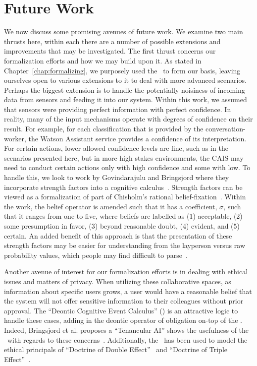 \section{Future Work}

We now discuss some promising avenues of future work. We examine two main
thrusts here, within each there are a number of possible extensions and
improvements that may be investigated. The first thrust concerns our
formalization efforts and how we may build upon it. As stated in
Chapter~\ref{chap:formalizing}, we purposely used the \CEC\ to form our
basis, leaving ourselves open to various extensions to it to deal with
more advanced scenarios. Perhaps the biggest extension is to handle the
potentially noisiness of incoming data from sensors and feeding it into
our system. Within this work, we assumed that sensors were providing
perfect information with perfect confidence. In reality, many of the input
mechanisms operate with degrees of confidence on their result. For example,
for each classification that is provided by the conversation-worker, the
Watson Assistant service provides a confidence of its interpretation. For
certain actions, lower allowed confidence levels are fine, such as in the
scenarios presented here, but in more high stakes environments,
the CAIS may need to conduct certain actions only with high confidence and
some with low. To handle this, we look to work by Govindarajulu and
Bringsjord where they incorporate strength factors into a cognitive
calculus~\cite{govindarajulu_strength_2017}. Strength factors can be viewed
as a formalization of part of Chisholm’s rational
belief-fixation~\cite{theory.of.knowledge3.chisholm}. Within the work,
the belief operator is amended such that it has a coefficient, $\sigma$,
such that it ranges from one to five, where beliefs are labelled as (1)
acceptable, (2) some presumption in favor, (3) beyond reasonable doubt,
(4) evident, and (5) certain. An added benefit of this approach is that
the presentation of these strength factors may be easier for understanding
from the layperson versus raw probability values, which people may find
difficult to parse~\cite{kaye_can_1991}.

Another avenue of interest for our formalization efforts is in dealing with 
ethical issues and matters of privacy. When utilizing these collaborative spaces,
as information about specific users grows, a user would have a reasonable
belief that the system will not offer sensitive information to their
colleagues without prior approval. The ``Deontic Cognitive Event
Calculus'' (\DCEC) is an attractive logic to handle these cases, adding in the
deontic operator of obligation on-top of the \CEC. Indeed, Bringsjord et al.
proposes a ``Tenancular AI'' shows the usefulness of the \DCEC\ with regards
to these concerns~\cite{bringsjord_tentacular_2018}. Additionally, the \DCEC\
has been used to model the ethical principals of ``Doctrine of Double
Effect''~\cite{govindarajulu_automating_2017} and ``Doctrine of Triple
Effect''~\cite{peveler_towards_2018}.

